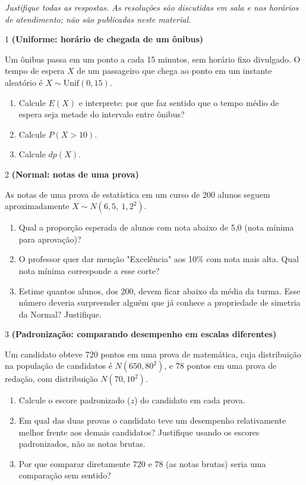 \documentclass[11pt]{article}
\begin{document}

\noindent \textit{Justifique todas as respostas. As resoluções são discutidas em sala e nos horários de atendimento; não são publicadas neste material.}

\begin{questao}{1} \textbf{(Uniforme: horário de chegada de um ônibus)}

Um ônibus passa em um ponto a cada 15 minutos, sem horário fixo divulgado. O tempo de espera $X$
de um passageiro que chega ao ponto em um instante aleatório é $X\sim\text{Unif}(0,15)$.

\begin{enumerate}[label=(\alph*)]
  \item Calcule $E(X)$ e interprete: por que faz sentido que o tempo médio de espera seja metade
    do intervalo entre ônibus?
  \item Calcule $P(X>10)$.
  \item Calcule $dp(X)$.
\end{enumerate}
\end{questao}

\begin{questao}{2} \textbf{(Normal: notas de uma prova)}

As notas de uma prova de estatística em um curso de 200 alunos seguem aproximadamente
$X\sim N(6{,}5,\ 1{,}2^2)$.

\begin{enumerate}[label=(\alph*)]
  \item Qual a proporção esperada de alunos com nota abaixo de 5,0 (nota mínima para aprovação)?
  \item O professor quer dar menção "Excelência" aos 10\% com nota mais alta. Qual nota mínima
    corresponde a esse corte?
  \item Estime quantos alunos, dos 200, devem ficar abaixo da média da turma. Esse número deveria
    surpreender alguém que já conhece a propriedade de simetria da Normal? Justifique.
\end{enumerate}
\end{questao}

\begin{questao}{3} \textbf{(Padronização: comparando desempenho em escalas diferentes)}

Um candidato obteve 720 pontos em uma prova de matemática, cuja distribuição na população de
candidatos é $N(650, 80^2)$, e 78 pontos em uma prova de redação, com distribuição $N(70, 10^2)$.

\begin{enumerate}[label=(\alph*)]
  \item Calcule o escore padronizado ($z$) do candidato em cada prova.
  \item Em qual das duas provas o candidato teve um desempenho relativamente melhor frente aos
    demais candidatos? Justifique usando os escores padronizados, não as notas brutas.
  \item Por que comparar diretamente 720 e 78 (as notas brutas) seria uma comparação sem sentido?
\end{enumerate}
\end{questao}
\end{document}
